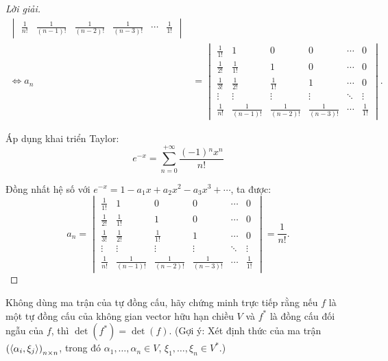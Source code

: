 \begin{proof}[Lời giải]
\begin{align*}
\begin{vmatrix}
            \frac{1}{n!} & \frac{1}{(n-1)!} & \frac{1}{(n-2)!} & \frac{1}{(n-3)!} & \cdots & \frac{1}{1!}
        \end{vmatrix}  \\
        \Longleftrightarrow a_{n} & =
        \begin{vmatrix}
            \frac{1}{1!} & 1                & 0                & 0                & \cdots & 0            \\
            \frac{1}{2!} & \frac{1}{1!}     & 1                & 0                & \cdots & 0            \\
            \frac{1}{3!} & \frac{1}{2!}     & \frac{1}{1!}     & 1                & \cdots & 0            \\
            \vdots       & \vdots           & \vdots           & \vdots           & \ddots & \vdots       \\
            \frac{1}{n!} & \frac{1}{(n-1)!} & \frac{1}{(n-2)!} & \frac{1}{(n-3)!} & \cdots & \frac{1}{1!}
        \end{vmatrix}.
    \end{align*}

    Áp dụng khai triển Taylor:
    \[
        e^{-x} = \sum^{+\infty}_{n=0}\frac{(-1){}^{n}x^{n}}{n!}
    \]
    
    Đồng nhất hệ số với $e^{-x} = 1 - a_{1}x + a_{2}x^{2} - a_{3}x^{3} + \cdots$, ta được:
    \[
        a_{n} =
        \begin{vmatrix}
            \frac{1}{1!} & 1                & 0                & 0                & \cdots & 0            \\
            \frac{1}{2!} & \frac{1}{1!}     & 1                & 0                & \cdots & 0            \\
            \frac{1}{3!} & \frac{1}{2!}     & \frac{1}{1!}     & 1                & \cdots & 0            \\
            \vdots       & \vdots           & \vdots           & \vdots           & \ddots & \vdots       \\
            \frac{1}{n!} & \frac{1}{(n-1)!} & \frac{1}{(n-2)!} & \frac{1}{(n-3)!} & \cdots & \frac{1}{1!}
        \end{vmatrix}
        = \frac{1}{n!}.
    \]
\end{proof}

\begin{exercise}
    Không dùng ma trận của tự đồng cấu, hãy chứng minh trực tiếp rằng nếu $f$ là một tự đồng cấu của không gian vector hữu hạn chiều $V$ và $f^{*}$ là đồng cấu đối ngẫu của $f$, thì $\det(f^{*}) = \det(f)$. (Gợi ý: Xét định thức của ma trận ${\left(\left\langle{\alpha_{i},\xi_{j}}\right\rangle\right)}_{n\times n}$, trong đó $\alpha_{1},\ldots,\alpha_{n}\in V$, $\xi_{1},\ldots ,\xi_{n}\in V^{*}$.)
\end{exercise}

